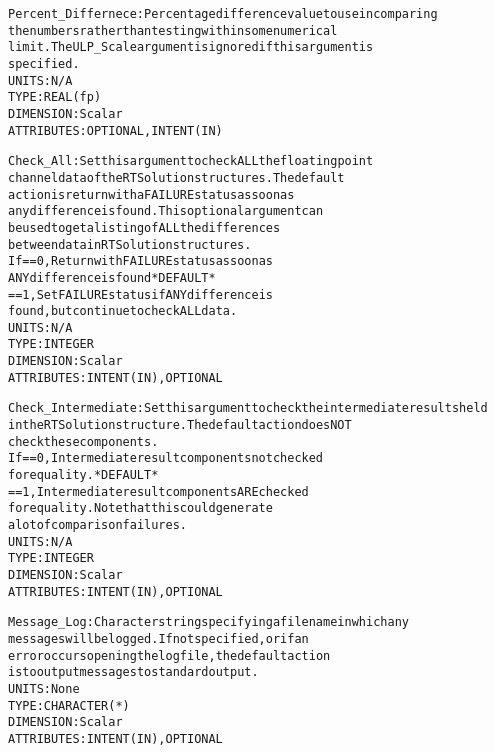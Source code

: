 \begin{alltt}
        Percent_Differnece: Percentage difference value to use in comparing
                            the numbers rather than testing within some numerical
                            limit. The ULP_Scale argument is ignored if this argument is
                            specified.
                            UNITS:      N/A
                            TYPE:       REAL(fp)
                            DIMENSION:  Scalar
                            ATTRIBUTES: OPTIONAL, INTENT(IN)
 
        Check_All:          Set this argument to check ALL the floating point
                            channel data of the RTSolution structures. The default
                            action is return with a FAILURE status as soon as
                            any difference is found. This optional argument can
                            be used to get a listing of ALL the differences
                            between data in RTSolution structures.
                            If == 0, Return with FAILURE status as soon as
                                     ANY difference is found  *DEFAULT*
                               == 1, Set FAILURE status if ANY difference is
                                     found, but continue to check ALL data.
                            UNITS:      N/A
                            TYPE:       INTEGER
                            DIMENSION:  Scalar
                            ATTRIBUTES: INTENT(IN), OPTIONAL
 
        Check_Intermediate: Set this argument to check the intermediate results held
                            in the RTSolution structure. The default action does NOT
                            check these components.
                            If == 0, Intermediate result components not checked
                                     for equality.  *DEFAULT*
                               == 1, Intermediate result components ARE checked
                                     for equality. Note that this could generate
                                     a lot of comparison failures.
                            UNITS:      N/A
                            TYPE:       INTEGER
                            DIMENSION:  Scalar
                            ATTRIBUTES: INTENT(IN), OPTIONAL
 
        Message_Log:        Character string specifying a filename in which any
                            messages will be logged. If not specified, or if an
                            error occurs opening the log file, the default action
                            is to output messages to standard output.
                            UNITS:      None
                            TYPE:       CHARACTER(*)
                            DIMENSION:  Scalar
                            ATTRIBUTES: INTENT(IN), OPTIONAL
 

\end{alltt}
